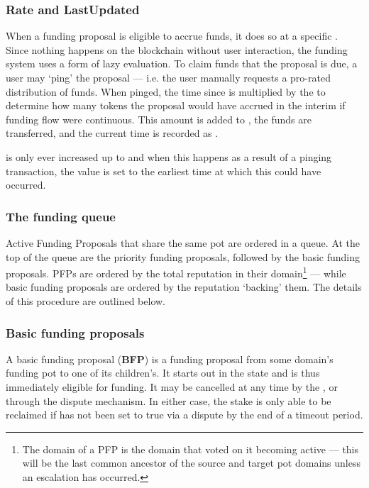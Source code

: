 \subsubsection{Rate and LastUpdated}
When a funding proposal is eligible to accrue funds, it does so at a specific . Since nothing happens on the blockchain without user interaction, the funding system uses a form of lazy evaluation. To claim funds that the proposal is due, a user may `ping' the proposal --- i.e. the user manually requests a pro-rated distribution of funds. When pinged, the time since  is multiplied by the  to determine how many tokens the proposal would have accrued in the interim if funding flow were continuous. This amount is added to , the funds are transferred, and the current time is recorded as .

 is only ever increased up to  and when this happens as a result of a pinging transaction, the  value is set to the earliest time at which this could have occurred.

\subsubsection{The funding queue}\label{subsec:funding-queue}
Active Funding Proposals that share the same  pot are ordered in a queue. At the top of the queue are the priority funding proposals, followed by the basic funding proposals. PFPs are ordered by the total reputation in their domain\footnote{The domain of a PFP is the domain that voted on it becoming active --- this will be the last common ancestor of the source and target pot domains unless an escalation has occurred.} --- while basic funding proposals are ordered by the reputation `backing' them.  The details of this procedure are outlined below.

\subsubsection{Basic funding proposals}\label{subsubsec:BFPs}
A basic funding proposal (\textbf{BFP}) is a funding proposal from some domain's funding pot to one of its children's. It starts out in the  state and is thus immediately eligible for funding. It may be cancelled at any time by the , or through the dispute mechanism. In either case, the stake is only able to be reclaimed if  has not been set to true via a dispute by the end of a timeout period.

